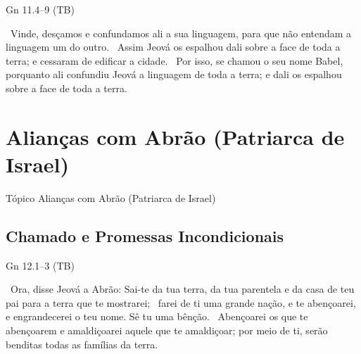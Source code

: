 \documentclass[12pt,aspectratio=169]{beamer}
\newcommand{\ver}[1]{%
    \raisebox{0.50ex}{%
        \scalebox{1.1}{%
            \pmb{\textbf{\textcolor{BSpbg}{#1}}}%
        }%
    }%
}
\newcommand{\QUOTE}[1]{%
    \par\noindent\hspace*{0.05\linewidth}%
    \begin{minipage}{0.9\linewidth}%
        \linespread{1.35}\large{#1}%
    \end{minipage}%
}
\newcommand{\RED}[1]{{\textcolor{TXred}{#1}}}
\newcommand{\YEL}[1]{{\textcolor{TXyel}{#1}}}
\newcommand{\GRE}[1]{{\textcolor{TXgre}{#1}}}
\newcommand{\CYA}[1]{{\textcolor{TXcya}{#1}}}
\newcommand{\BLU}[1]{{\textcolor{TXblu}{#1}}}
\newcommand{\MAG}[1]{{\textcolor{TXmag}{#1}}}
\newcommand{\BRI}[1]{{\textcolor{BSpbg}{#1}}}   %
\begin{document}
    \begin{frame}{Gn 11.4--9 (TB)}
        \QUOTE{%
            \ver{7}~Vinde, desçamos e confundamos ali a sua linguagem, para que não entendam a
            linguagem um do outro.
            \ver{8}~Assim Jeová os \YEL{espalhou dali} sobre a face de toda a terra; e cessaram
            de edificar a cidade.
            \ver{9}~Por isso, se chamou o seu nome \YEL{Babel}, porquanto ali \YEL{confundiu}
            Jeová a linguagem de toda a terra; e dali os \YEL{espalhou} sobre a face de toda a
            terra.
        }
    \end{frame}

\section{Alianças com Abrão (Patriarca de Israel)}

    \begin{frame}
        \par\noindent\hspace*{0.05\linewidth}%
        \begin{minipage}{0.9\linewidth}%
            \large%
            \begin{alertblock}{Tópico}
                Alianças com Abrão (Patriarca de Israel)
            \end{alertblock}
        \end{minipage}%
    \end{frame}

    \subsection{Chamado e Promessas \BRI{Incondicionais}}

    \begin{frame}{Gn 12.1--3 (TB)}
        \QUOTE{%
            \ver{1}~Ora, disse Jeová a Abrão: Sai-te da tua terra, da tua parentela e da casa de
            teu pai para a terra que te mostrarei;
            \ver{2}~farei de ti uma \YEL{grande nação}, e te \GRE{abençoarei}, e
            \CYA{engrandecerei} o teu nome.  \GRE{Sê tu uma bênção}.
            \ver{3}~\BLU{Abençoarei os que te abençoarem} e \RED{amaldiçoarei aquele que te
            amaldiçoar}; por meio de ti, serão \MAG{benditas todas as famílias da terra}.
        }
    \end{frame}
\end{document}
